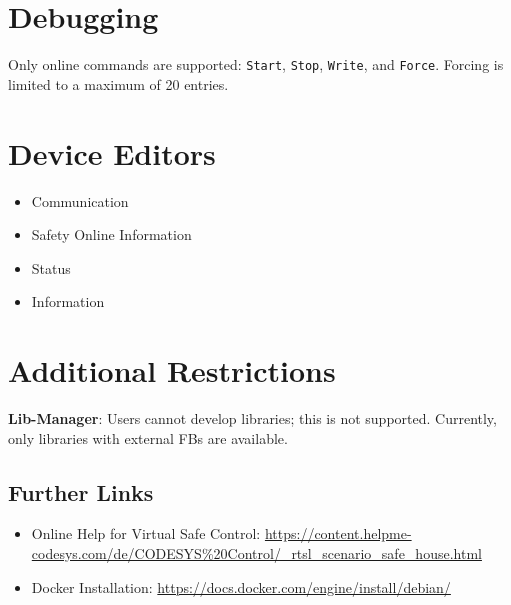 \documentclass[a4paper,12pt]{article}
\begin{document}
\section{Debugging}
Only online commands are supported: \texttt{Start}, \texttt{Stop}, \texttt{Write}, and \texttt{Force}. Forcing is limited to a maximum of 20 entries.

\section{Device Editors}
\begin{itemize}
	\item Communication
	\item Safety Online Information
	\item Status
	\item Information
\end{itemize}

\section{Additional Restrictions}
\textbf{Lib-Manager}: Users cannot develop libraries; this is not supported. Currently, only libraries with external FBs are available.

\subsection{Further Links}
\begin{itemize}
	\item Online Help for Virtual Safe Control: \url{https://content.helpme-codesys.com/de/CODESYS%20Control/_rtsl_scenario_safe_house.html}
	\item Docker Installation: \url{https://docs.docker.com/engine/install/debian/}
\end{itemize}
\end{document}
